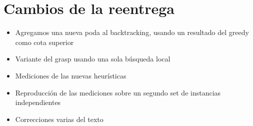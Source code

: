 \section*{Cambios de la reentrega}

\begin{itemize}

    \item Agregamos una nueva poda al backtracking, usando un resultado del greedy como cota superior
    \item Variante del grasp usando una sola búsqueda local
    \item Mediciones de las nuevas heurísticas
    \item Reproducción de las mediciones sobre un segundo set de instancias independientes
    \item Correcciones varias del texto

\end{itemize}
